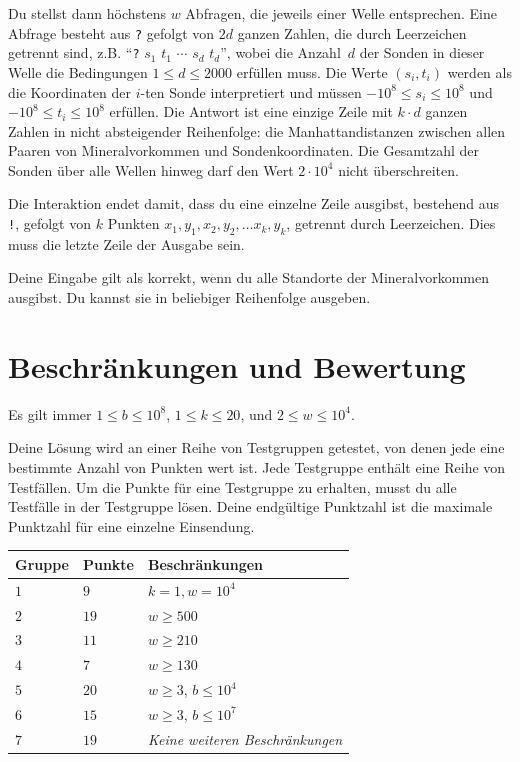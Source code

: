 Du stellst dann höchstens $w$ Abfragen, die jeweils einer Welle entsprechen.
Eine Abfrage besteht aus \texttt{?} gefolgt von $2d$ ganzen Zahlen, die durch Leerzeichen getrennt sind, z.B. ``\texttt{?} $s_1$ $t_1$ $\cdots$ $s_d$ $t_d$'', wobei die Anzahl~$d$ der Sonden in dieser Welle die Bedingungen
$1\leq d\leq 2000$ %
erfüllen muss.
Die Werte $(s_i,t_i)$ werden als die Koordinaten der $i$-ten Sonde interpretiert und müssen
$-10^8 \leq s_i \leq 10^8$ und $-10^8 \leq t_i \leq 10^8$ %
erfüllen.
Die Antwort ist eine einzige Zeile mit $k \cdot d$ ganzen Zahlen in nicht absteigender Reihenfolge: die Manhattandistanzen zwischen allen Paaren von Mineralvorkommen und Sondenkoordinaten.
Die Gesamtzahl der Sonden über alle Wellen hinweg darf den Wert
$2\cdot 10^4$ %
nicht überschreiten.

Die Interaktion endet damit, dass du eine einzelne Zeile ausgibst, bestehend aus \texttt{!}, gefolgt von $k$ Punkten $x_1, y_1, x_2, y_2, \ldots x_k, y_k$, getrennt durch Leerzeichen.
Dies muss die letzte Zeile der Ausgabe sein.

Deine Eingabe gilt als korrekt, wenn du alle Standorte der Mineralvorkommen ausgibst.
Du kannst sie in beliebiger Reihenfolge ausgeben.

\section*{Beschränkungen und Bewertung}

Es gilt immer
$1\leq b \leq 10^8$, %
$1 \leq k \leq 20$, %
und
$2 \le w \le 10^4$. %

Deine Lösung wird an einer Reihe von Testgruppen getestet, von denen jede eine bestimmte Anzahl von Punkten wert ist.
Jede Testgruppe enthält eine Reihe von Testfällen.
Um die Punkte für eine Testgruppe zu erhalten, musst du alle Testfälle in der Testgruppe lösen.
Deine endgültige Punktzahl ist die maximale Punktzahl für eine einzelne Einsendung.

\medskip
\begin{tabular}{lll}
Gruppe & Punkte & Beschränkungen \\\hline
  $1$ & $9$ & $k = 1, w = 10^4$\\
  $2$ & $19$ & $w \ge 500$\\
  $3$ & $11$ & $w \ge 210$\\
  $4$ & $7$ & $w \ge 130$\\
  $5$ & $20$ & $w \ge 3$, $b \le 10^4$\\
  $6$ & $15$ & $w \ge 3$, $b \le 10^7$\\
  $7$ & $19$ & \emph{Keine weiteren Beschränkungen}
\end{tabular}

